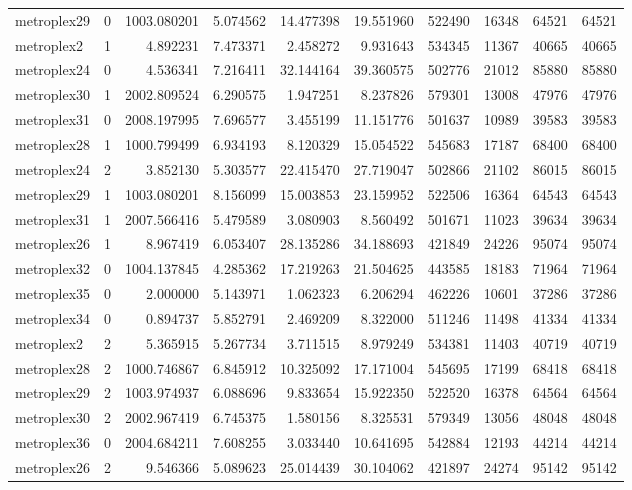 \begin{longtable}{|l|r|r|r|r|r|r|r|r|r|}
metroplex29 & 0 & 1003.080201 & 5.074562 & 14.477398 & 19.551960 & 522490 & 16348 & 64521 & 64521 \\
metroplex2 & 1 & 4.892231 & 7.473371 & 2.458272 & 9.931643 & 534345 & 11367 & 40665 & 40665 \\
metroplex24 & 0 & 4.536341 & 7.216411 & 32.144164 & 39.360575 & 502776 & 21012 & 85880 & 85880 \\
metroplex30 & 1 & 2002.809524 & 6.290575 & 1.947251 & 8.237826 & 579301 & 13008 & 47976 & 47976 \\
metroplex31 & 0 & 2008.197995 & 7.696577 & 3.455199 & 11.151776 & 501637 & 10989 & 39583 & 39583 \\
metroplex28 & 1 & 1000.799499 & 6.934193 & 8.120329 & 15.054522 & 545683 & 17187 & 68400 & 68400 \\
metroplex24 & 2 & 3.852130 & 5.303577 & 22.415470 & 27.719047 & 502866 & 21102 & 86015 & 86015 \\
metroplex29 & 1 & 1003.080201 & 8.156099 & 15.003853 & 23.159952 & 522506 & 16364 & 64543 & 64543 \\
metroplex31 & 1 & 2007.566416 & 5.479589 & 3.080903 & 8.560492 & 501671 & 11023 & 39634 & 39634 \\
metroplex26 & 1 & 8.967419 & 6.053407 & 28.135286 & 34.188693 & 421849 & 24226 & 95074 & 95074 \\
metroplex32 & 0 & 1004.137845 & 4.285362 & 17.219263 & 21.504625 & 443585 & 18183 & 71964 & 71964 \\
metroplex35 & 0 & 2.000000 & 5.143971 & 1.062323 & 6.206294 & 462226 & 10601 & 37286 & 37286 \\
metroplex34 & 0 & 0.894737 & 5.852791 & 2.469209 & 8.322000 & 511246 & 11498 & 41334 & 41334 \\
metroplex2 & 2 & 5.365915 & 5.267734 & 3.711515 & 8.979249 & 534381 & 11403 & 40719 & 40719 \\
metroplex28 & 2 & 1000.746867 & 6.845912 & 10.325092 & 17.171004 & 545695 & 17199 & 68418 & 68418 \\
metroplex29 & 2 & 1003.974937 & 6.088696 & 9.833654 & 15.922350 & 522520 & 16378 & 64564 & 64564 \\
metroplex30 & 2 & 2002.967419 & 6.745375 & 1.580156 & 8.325531 & 579349 & 13056 & 48048 & 48048 \\
metroplex36 & 0 & 2004.684211 & 7.608255 & 3.033440 & 10.641695 & 542884 & 12193 & 44214 & 44214 \\
metroplex26 & 2 & 9.546366 & 5.089623 & 25.014439 & 30.104062 & 421897 & 24274 & 95142 & 95142 \\

\end{longtable}
